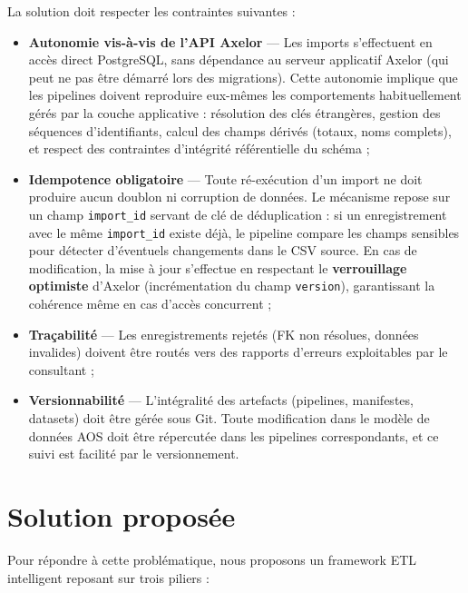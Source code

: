 La solution doit respecter les contraintes suivantes :
\begin{itemize}
    \item \textbf{Autonomie vis-à-vis de l'API Axelor} — Les imports s'effectuent en accès direct PostgreSQL, sans dépendance au serveur applicatif Axelor (qui peut ne pas être démarré lors des migrations). Cette autonomie implique que les pipelines doivent reproduire eux-mêmes les comportements habituellement gérés par la couche applicative : résolution des clés étrangères, gestion des séquences d'identifiants, calcul des champs dérivés (totaux, noms complets), et respect des contraintes d'intégrité référentielle du schéma ;
    \item \textbf{Idempotence obligatoire} — Toute ré-exécution d'un import ne doit produire aucun doublon ni corruption de données. Le mécanisme repose sur un champ \texttt{import\_id} servant de clé de déduplication : si un enregistrement avec le même \texttt{import\_id} existe déjà, le pipeline compare les champs sensibles pour détecter d'éventuels changements dans le CSV source. En cas de modification, la mise à jour s'effectue en respectant le \textbf{verrouillage optimiste} d'Axelor (incrémentation du champ \texttt{version}), garantissant la cohérence même en cas d'accès concurrent ;
    \item \textbf{Traçabilité} — Les enregistrements rejetés (FK non résolues, données invalides) doivent être routés vers des rapports d'erreurs exploitables par le consultant ;
    \item \textbf{Versionnabilité} — L'intégralité des artefacts (pipelines, manifestes, datasets) doit être gérée sous Git. Toute modification dans le modèle de données AOS doit être répercutée dans les pipelines correspondants, et ce suivi est facilité par le versionnement.
\end{itemize}

\section{Solution proposée}
\label{sec:solution}

Pour répondre à cette problématique, nous proposons un framework ETL intelligent reposant sur trois piliers :

